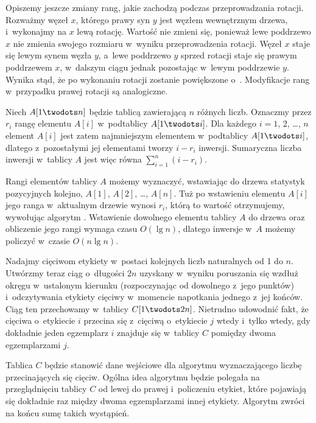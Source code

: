 Opiszemy jeszcze zmiany rang, jakie zachodzą podczas przeprowadzania rotacji.
Rozważmy węzeł $x$, którego prawy syn $y$ jest węzłem wewnętrznym drzewa, i~wykonajmy na $x$ lewą rotację.
Wartość  nie zmieni się, ponieważ lewe poddrzewo $x$ nie zmienia swojego rozmiaru w~wyniku przeprowadzenia rotacji.
Węzeł $x$ staje się lewym synem węzła $y$, a~lewe poddrzewo $y$ sprzed rotacji staje się prawym poddrzewem $x$, w~dalszym ciągu jednak pozostając w~lewym poddrzewie $y$.
Wynika stąd, że po wykonaniu rotacji  zostanie powiększone o~.
Modyfikacje rang w~przypadku prawej rotacji są analogiczne.

\exercise %
Niech $A[1\twodots n]$ będzie tablicą zawierającą $n$ różnych liczb.
Oznaczmy przez $r_i$ rangę elementu $A[i]$ w~podtablicy $A[1\twodots i]$.
Dla każdego $i=1$, 2, \dots, $n$ element $A[i]$ jest zatem  najmniejszym elementem w~podtablicy $A[1\twodots i]$, dlatego z~pozostałymi jej elementami tworzy $i-r_i$ inwersji.
Sumaryczna liczba inwersji w~tablicy $A$ jest więc równa $\sum_{i=1}^n(i-r_i)$.

Rangi elementów tablicy $A$ możemy wyznaczyć, wstawiając do drzewa statystyk pozycyjnych kolejno, $A[1]$, $A[2]$, \dots, $A[n]$.
Tuż po wstawieniu elementu $A[i]$ jego ranga w~aktualnym drzewie wynosi $r_i$, którą to wartość otrzymujemy, wywołując algorytm .
Wstawienie dowolnego elementu tablicy $A$ do drzewa oraz obliczenie jego rangi wymaga czasu $O(\lg n)$, dlatego inwersje w~$A$ możemy policzyć w~czasie $O(n\lg n)$.

\exercise %
Nadajmy cięciwom etykiety w~postaci kolejnych liczb naturalnych od 1 do $n$.
Utwórzmy teraz ciąg o~długości $2n$ uzyskany w~wyniku poruszania się wzdłuż okręgu w~ustalonym kierunku (rozpoczynając od dowolnego z~jego punktów) i~odczytywania etykiety cięciwy w~momencie napotkania jednego z~jej końców.
Ciąg ten przechowamy w~tablicy $C[1\twodots2n]$.
Nietrudno udowodnić fakt, że cięciwa o~etykiecie $i$ przecina się z~cięciwą o~etykiecie $j$ wtedy i~tylko wtedy, gdy dokładnie jeden egzemplarz $i$ znajduje się w~tablicy $C$ pomiędzy dwoma egzemplarzami $j$.

Tablica $C$ będzie stanowić dane wejściowe dla algorytmu  wyznaczającego liczbę przecinających się cięciw.
Ogólna idea algorytmu będzie polegała na przeglądnięciu tablicy $C$ od lewej do prawej i~policzeniu etykiet, które pojawiają się dokładnie raz między dwoma egzemplarzami innej etykiety.
Algorytm zwróci na końcu sumę takich wystąpień.

